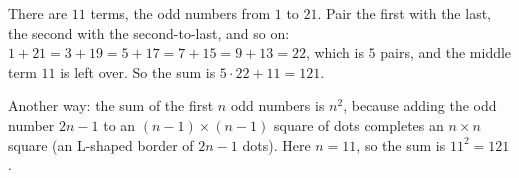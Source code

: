 There are $11$ terms, the odd numbers from $1$ to $21$. Pair the first with the last, the second with the second-to-last, and so on: $1+21=3+19=5+17=7+15=9+13=22$, which is $5$ pairs, and the middle term $11$ is left over. So the sum is $5\cdot22+11=121$.

Another way: the sum of the first $n$ odd numbers is $n^2$, because adding the odd number $2n-1$ to an $(n-1)\times(n-1)$ square of dots completes an $n\times n$ square (an L-shaped border of $2n-1$ dots). Here $n=11$, so the sum is $11^2=\boxed{121}$.
